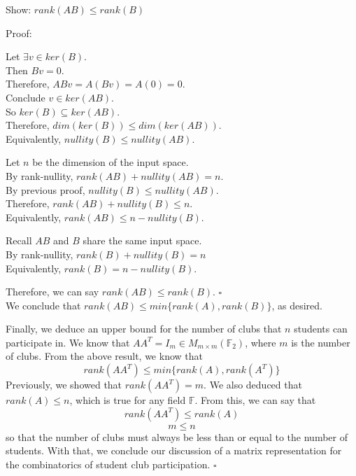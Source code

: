\documentclass[12pt, letterpaper]{article}
\newcommand{\F}{\mathbb{F}}
\newcommand{\0}{\textbf{0}}
\newcommand{\1}{\textbf{1}}
\begin{document}
Show: $rank(AB) \le rank(B)$

Proof:

Let $\exists v \in ker(B)$. \\
Then $Bv = 0$. \\
Therefore, $ABv = A(Bv) = A(0) = 0$. \\
Conclude $v \in ker(AB)$. \\
So $ker(B) \subseteq ker(AB)$. \\
Therefore, $dim(ker(B)) \le dim(ker(AB))$. \\
Equivalently, $nullity(B) \le nullity(AB)$.
\vspace{0.5em}

Let $n$ be the dimension of the input space. \\
By rank-nullity, $rank(AB) + nullity(AB) = n$. \\
By previous proof, $nullity(B) \le nullity(AB)$. \\
Therefore, $rank(AB) + nullity(B) \le n$. \\
Equivalently, $rank(AB) \le n - nullity(B)$.
\vspace{0.5em}

Recall $AB$ and $B$ share the same input space. \\
By rank-nullity, $rank(B) + nullity(B) = n$ \\
Equivalently, $rank(B) = n - nullity(B)$.
\vspace{0.5em}

Therefore, we can say $rank(AB) \le rank(B)$. $\square$ \\

We conclude that $rank(AB) \le min\{rank(A),rank(B)\}$, as desired.

Finally, we deduce an upper bound for the number of clubs that $n$ students can participate in. We know that $AA^T = I_m \in M_{m \times m}(\F_2)$, where $m$ is the number of clubs. From the above result, we know that
$$rank(AA^T) \le min\{rank(A),rank(A^T)\}$$
Previously, we showed that $rank(AA^T) = m$. We also deduced that $rank(A) \le n$, which is true for any field $\F$. From this, we can say that
$$rank(AA^T) \le rank(A)$$
$$m \le n$$
so that the number of clubs must always be less than or equal to the number of students. With that, we conclude our discussion of a matrix representation for the combinatorics of student club participation. $\square$
\end{document}
